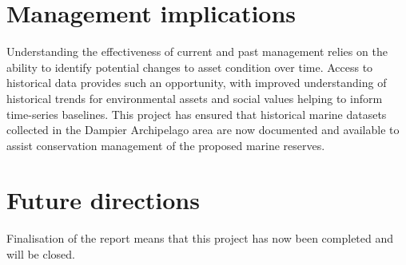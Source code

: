 \documentclass[version=last,
    paper=a4, %
    10pt, %
    usenames,
    dvipsnames,
    oneside, %
    headings=openany, %
    DIV=15 %
]{scrbook}
\begin{document}
\section*{Management implications}
Understanding the effectiveness of current and past management relies on
the ability to identify potential changes to asset condition over time.
Access to historical data provides such an opportunity, with improved
understanding of historical trends for environmental assets and social
values helping to inform time-series baselines. This project has ensured
that historical marine datasets collected in the Dampier Archipelago
area are now documented and available to assist conservation management
of the proposed marine reserves.



\section*{Future directions}
Finalisation of the report means that this project has now been
completed and will be closed.



\end{document}
